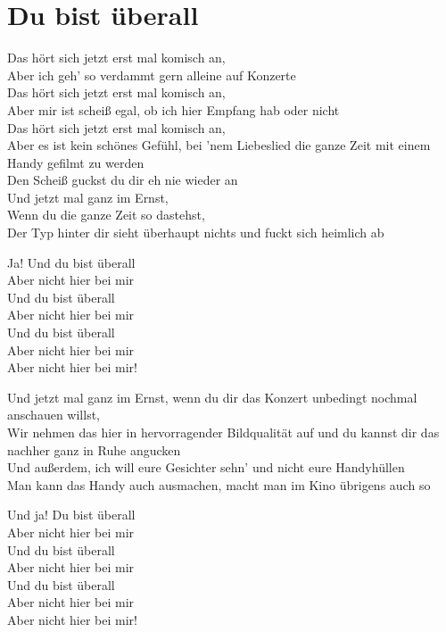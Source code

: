 \documentclass[]{book}
\begin{document}
\hypertarget{du-bist-uberall-1}{%
\section{Du bist überall}\label{du-bist-uberall-1}}

Das hört sich jetzt erst mal komisch an,\\
Aber ich geh' so verdammt gern alleine auf Konzerte\\
Das hört sich jetzt erst mal komisch an,\\
Aber mir ist scheiß egal, ob ich hier Empfang hab oder nicht\\
Das hört sich jetzt erst mal komisch an,\\
Aber es ist kein schönes Gefühl, bei 'nem Liebeslied die ganze Zeit mit einem Handy gefilmt zu werden\\
Den Scheiß guckst du dir eh nie wieder an\\
Und jetzt mal ganz im Ernst,\\
Wenn du die ganze Zeit so dastehst,\\
Der Typ hinter dir sieht überhaupt nichts und fuckt sich heimlich ab

Ja! Und du bist überall\\
Aber nicht hier bei mir\\
Und du bist überall\\
Aber nicht hier bei mir\\
Und du bist überall\\
Aber nicht hier bei mir\\
Aber nicht hier bei mir!

Und jetzt mal ganz im Ernst, wenn du dir das Konzert unbedingt nochmal anschauen willst,\\
Wir nehmen das hier in hervorragender Bildqualität auf und du kannst dir das nachher ganz in Ruhe angucken\\
Und außerdem, ich will eure Gesichter sehn' und nicht eure Handyhüllen\\
Man kann das Handy auch ausmachen, macht man im Kino übrigens auch so

Und ja! Du bist überall\\
Aber nicht hier bei mir\\
Und du bist überall\\
Aber nicht hier bei mir\\
Und du bist überall\\
Aber nicht hier bei mir\\
Aber nicht hier bei mir!
\end{document}
